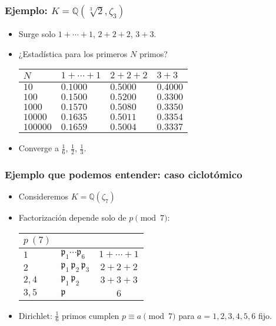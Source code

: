 \documentclass{beamer}
\newcommand{\QQ}{\mathbb{Q}}
\begin{document}
\begin{frame}[fragile]
  \frametitle{Ejemplo: $K = \QQ (\sqrt[3]{2}, \zeta_3)$}

  \begin{itemize}
  \item Surge solo $1 + \cdots + 1$, $2 + 2 + 2$, $3 + 3$.

  \item ¿Estadística para los primeros $N$ primos?
    \begin{center}
      \renewcommand{\arraystretch}{1.5}
      \begin{tabular}{lx{2cm}x{2cm}x{2cm}}
        $N$      & $1+\cdots+1$ & $2+2+2$ & $3+3$ \tabularnewline
        \hline
        $10$     & $0.1000$ & $0.5000$ & $0.4000$ \tabularnewline
        $100$    & $0.1500$ & $0.5200$ & $0.3300$ \tabularnewline
        $1000$   & $0.1570$ & $0.5080$ & $0.3350$ \tabularnewline
        $10000$  & $0.1635$ & $0.5011$ & $0.3354$ \tabularnewline
        $100000$ & $0.1659$ & $0.5004$ & $0.3337$ \tabularnewline
      \end{tabular}
    \end{center}

  \item Converge a $\frac{1}{6}$, $\frac{1}{2}$, $\frac{1}{3}$.
  \end{itemize}
\end{frame}


\begin{frame}[fragile]
  \frametitle{Ejemplo que podemos entender: caso ciclotómico}

  \begin{itemize}
  \item Consideremos $K = \QQ (\zeta_7)$

  \item Factorización depende solo de $p \pmod{7}$:
    \begin{center}
      \renewcommand{\arraystretch}{1.5}
      \begin{tabular}{lx{3cm}c}
        $p~(7)$ &  &  \tabularnewline
        \hline
        $1$ & $\mathfrak{p}_1\cdots\mathfrak{p}_6$ & $1+\cdots+1$ \tabularnewline
        $2$ & $\mathfrak{p}_1\,\mathfrak{p}_2\,\mathfrak{p}_3$ & $2+2+2$ \tabularnewline
        $2,4$ & $\mathfrak{p}_1\,\mathfrak{p}_2$ & $3+3+3$ \tabularnewline
        $3,5$ & $\mathfrak{p}$ & $6$ \tabularnewline
      \end{tabular}
    \end{center}

  \item Dirichlet: $\frac{1}{6}$ primos cumplen $p \equiv a \pmod{7}$
    para $a = 1,2,3,4,5,6$ fijo.
  \end{itemize}
\end{frame}
\end{document}
